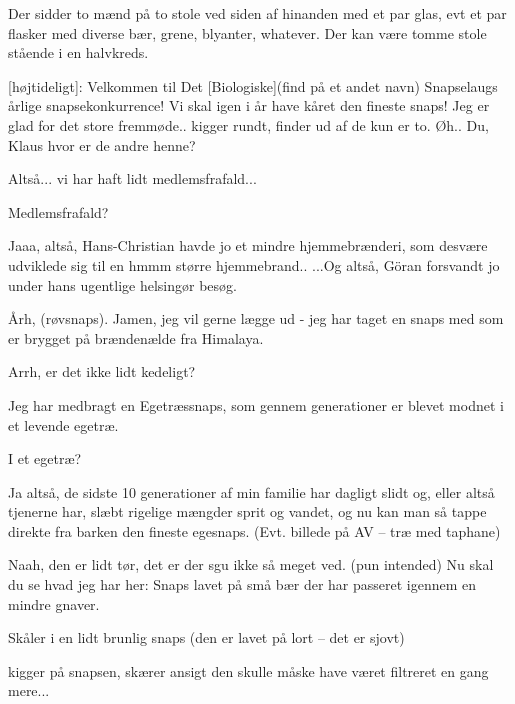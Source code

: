 \documentclass[a4paper,12pt]{article}
\begin{document}
\begin{sketch}

\scene Der sidder to mænd på to stole ved siden af hinanden med et par glas, evt et par flasker med diverse bær, grene, blyanter, whatever. Der kan være tomme stole stående i en halvkreds. 

[højtideligt]: Velkommen til Det [Biologiske](find på et andet navn) Snapselaugs årlige snapsekonkurrence! Vi skal igen i år have kåret den fineste snaps! Jeg er glad for det store fremmøde.. kigger rundt, finder ud af de kun er to. Øh.. Du, Klaus hvor er de andre henne?

Altså... vi har haft lidt medlemsfrafald... 

Medlemsfrafald?

Jaaa, altså, Hans-Christian havde jo et mindre hjemmebrænderi, som desvære udviklede sig til en hmmm større hjemmebrand..
...Og altså, Göran forsvandt jo under hans ugentlige helsingør besøg.


Årh, (røvsnaps). Jamen, jeg vil gerne lægge ud - jeg har taget en snaps med som er brygget på brændenælde fra Himalaya.


Arrh, er det ikke lidt kedeligt? 


Jeg har medbragt en Egetræssnaps, som gennem generationer er blevet modnet i et levende egetræ. 

I et egetræ?

Ja altså, de sidste 10 generationer af min familie har dagligt slidt og, eller altså tjenerne har, slæbt rigelige mængder sprit og vandet, og nu kan man så tappe direkte fra barken den fineste egesnaps.
(Evt. billede på AV -- træ med taphane)


Naah, den er lidt tør, det er der sgu ikke så meget ved. (pun intended) 
Nu skal du se hvad jeg har her: Snaps lavet på små bær der har passeret igennem en mindre gnaver. 

\scene Skåler i en lidt brunlig snaps (den er lavet på lort -- det er sjovt)

kigger på snapsen, skærer ansigt den skulle måske have været filtreret en gang mere...


\end{sketch}
\end{document}
